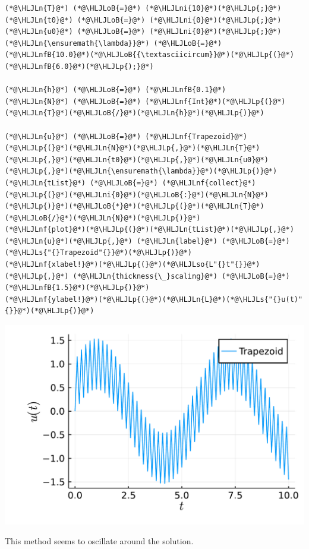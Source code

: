 \documentclass[12pt,a4paper]{article}
\newcommand{\HLJLn}[1]{#1}
\newcommand{\HLJLnf}[1]{\textcolor[RGB]{66,102,213}{#1}}
\newcommand{\HLJLs}[1]{\textcolor[RGB]{201,61,57}{#1}}
\newcommand{\HLJLso}[1]{\textcolor[RGB]{201,61,57}{#1}}
\newcommand{\HLJLnfB}[1]{\textcolor[RGB]{59,151,46}{#1}}
\newcommand{\HLJLni}[1]{\textcolor[RGB]{59,151,46}{#1}}
\newcommand{\HLJLoB}[1]{\textcolor[RGB]{102,102,102}{\textbf{#1}}}
\newcommand{\HLJLp}[1]{#1}
\begin{document}
\begin{lstlisting}
(*@\HLJLn{T}@*) (*@\HLJLoB{=}@*) (*@\HLJLni{10}@*)(*@\HLJLp{;}@*) (*@\HLJLn{t0}@*) (*@\HLJLoB{=}@*) (*@\HLJLni{0}@*)(*@\HLJLp{;}@*) (*@\HLJLn{u0}@*) (*@\HLJLoB{=}@*) (*@\HLJLni{0}@*)(*@\HLJLp{;}@*) (*@\HLJLn{\ensuremath{\lambda}}@*) (*@\HLJLoB{=}@*) (*@\HLJLnfB{10.0}@*)(*@\HLJLoB{{\textasciicircum}}@*)(*@\HLJLp{(}@*)(*@\HLJLnfB{6.0}@*)(*@\HLJLp{);}@*)

(*@\HLJLn{h}@*) (*@\HLJLoB{=}@*) (*@\HLJLnfB{0.1}@*)
(*@\HLJLn{N}@*) (*@\HLJLoB{=}@*) (*@\HLJLnf{Int}@*)(*@\HLJLp{(}@*)(*@\HLJLn{T}@*)(*@\HLJLoB{/}@*)(*@\HLJLn{h}@*)(*@\HLJLp{)}@*)

(*@\HLJLn{u}@*) (*@\HLJLoB{=}@*) (*@\HLJLnf{Trapezoid}@*)(*@\HLJLp{(}@*)(*@\HLJLn{N}@*)(*@\HLJLp{,}@*)(*@\HLJLn{T}@*)(*@\HLJLp{,}@*)(*@\HLJLn{t0}@*)(*@\HLJLp{,}@*)(*@\HLJLn{u0}@*)(*@\HLJLp{,}@*)(*@\HLJLn{\ensuremath{\lambda}}@*)(*@\HLJLp{)}@*)
(*@\HLJLn{tList}@*) (*@\HLJLoB{=}@*) (*@\HLJLnf{collect}@*)(*@\HLJLp{(}@*)(*@\HLJLni{0}@*)(*@\HLJLoB{:}@*)(*@\HLJLn{N}@*)(*@\HLJLp{)}@*)(*@\HLJLoB{*}@*)(*@\HLJLp{(}@*)(*@\HLJLn{T}@*)(*@\HLJLoB{/}@*)(*@\HLJLn{N}@*)(*@\HLJLp{)}@*)
(*@\HLJLnf{plot}@*)(*@\HLJLp{(}@*)(*@\HLJLn{tList}@*)(*@\HLJLp{,}@*) (*@\HLJLn{u}@*)(*@\HLJLp{,}@*) (*@\HLJLn{label}@*) (*@\HLJLoB{=}@*) (*@\HLJLs{"{}Trapezoid"{}}@*)(*@\HLJLp{)}@*)
(*@\HLJLnf{xlabel!}@*)(*@\HLJLp{(}@*)(*@\HLJLso{L"{}t"{}}@*)(*@\HLJLp{,}@*) (*@\HLJLn{thickness{\_}scaling}@*) (*@\HLJLoB{=}@*) (*@\HLJLnfB{1.5}@*)(*@\HLJLp{)}@*)
(*@\HLJLnf{ylabel!}@*)(*@\HLJLp{(}@*)(*@\HLJLn{L}@*)(*@\HLJLs{"{}u(t)"{}}@*)(*@\HLJLp{)}@*)
\end{lstlisting}

\includegraphics[width=\linewidth]{figures/ass_1_report_9_1.pdf}

This method seems to oscillate around the solution.
\end{document}
